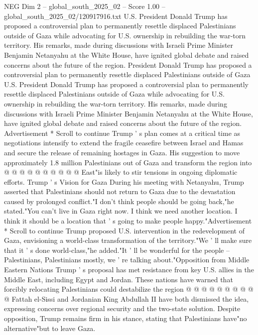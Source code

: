 \begin{textsample}{NEG Dim 2 – global\_south\_2025\_02 – Score 1.00 – global\_south\_2025\_02/120917916.txt}  \label{ex:f2_neg_024}
U.S.
President Donald Trump has proposed a controversial plan to permanently resettle displaced Palestinians outside of Gaza while advocating for U.S. ownership in rebuilding the war-torn territory.
His remarks, made during discussions with Israeli Prime Minister Benjamin Netanyahu at the White House, have ignited global debate and raised concerns about the future of the region.
President Donald Trump has proposed a controversial plan to permanently resettle displaced Palestinians outside of Gaza U.S.
President Donald Trump has proposed a controversial plan to permanently resettle displaced Palestinians outside of Gaza while advocating for U.S. ownership in rebuilding the war-torn territory.
His remarks, made during discussions with Israeli Prime Minister Benjamin Netanyahu at the White House, have ignited global debate and raised concerns about the future of the region.
Advertisement * Scroll to continue Trump ' s plan comes at a critical time as negotiations intensify to extend the fragile ceasefire between Israel and Hamas and secure the release of remaining hostages in Gaza.
His suggestion to move approximately 1.8 million Palestinians out of Gaza and transform the region into @ @ @ @ @ @ @ @ @ @ East"is likely to stir tensions in ongoing diplomatic efforts.
Trump ' s Vision for Gaza During his meeting with Netanyahu, Trump asserted that Palestinians should not return to Gaza due to the devastation caused by prolonged conflict."I don't think people should be going back,"he stated."You can't live in Gaza right now.
I think we need another location.
I think it should be a location that ' s going to make people happy."Advertisement * Scroll to continue Trump proposed U.S. intervention in the redevelopment of Gaza, envisioning a world-class transformation of the territory."We ' ll make sure that it ' s done world-class,"he added."It ' ll be wonderful for the people -- Palestinians, Palestinians mostly, we ' re talking about."Opposition from Middle Eastern Nations Trump ' s proposal has met resistance from key U.S. allies in the Middle East, including Egypt and Jordan.
These nations have warned that forcibly relocating Palestinians could destabilize the region @ @ @ @ @ @ @ @ @ @ Fattah el-Sissi and Jordanian King Abdullah II have both dismissed the idea, expressing concerns over regional security and the two-state solution.
Despite opposition, Trump remains firm in his stance, stating that Palestinians have"no alternative"but to leave Gaza.

\end{textsample}
